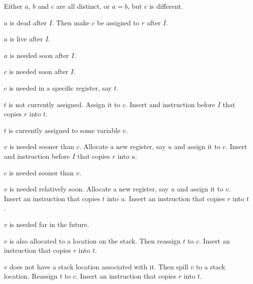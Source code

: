 \begin{legal}
\item Either $a$, $b$ and $c$ are all distinct, or $a = b$, but $c$ is
  different.
  \begin{legal}
  \item $a$ is dead after $I$.  Then make $c$ be assigned to $r$
    after $I$.
  \item $a$ is live after $I$.
    \begin{legal}
    \item $a$ is needed soon after $I$.
      \begin{legal}
      \item $c$ is needed soon after $I$.
        \begin{legal}
        \item $c$ is needed in a specific register, say $t$.
          \begin{legal}
          \item $t$ is not currently assigned.  Assign it to $c$.
            Insert and instruction before $I$ that copies $r$ into
            $t$.
          \item $t$ is currently assigned to some variable $v$.
            \begin{legal}
            \item $v$ is needed sooner than $c$.  Allocate a new
              register, say $u$ and assign it to $c$.  Insert and
              instruction before $I$ that copies $r$ into $u$.
            \item $c$ is needed sooner than $v$.
              \begin{legal}
              \item $v$ is needed relatively soon.
                Allocate a new register, say $u$ and assign it to
                $v$. Insert an instruction that copies $t$ into $u$.
                Insert an instruction that copies $r$ into $t$.
              \item $v$ is needed far in the future.
                \begin{legal}
                \item $v$ is also allocated to a location on the
                  stack.  Then reassign $t$ to $c$.  Insert an
                  instruction that copies $r$ into $t$.
                \item $v$ does not have a stack location associated
                  with it.  Then spill $v$ to a stack location.
                  Reassign $t$ to $c$.  Insert an instruction that
                  copies $r$ into $t$.

\end{legal}
\end{legal}
\end{legal}
\end{legal}
\end{legal}
\end{legal}
\end{legal}
\end{legal}
\end{legal}
